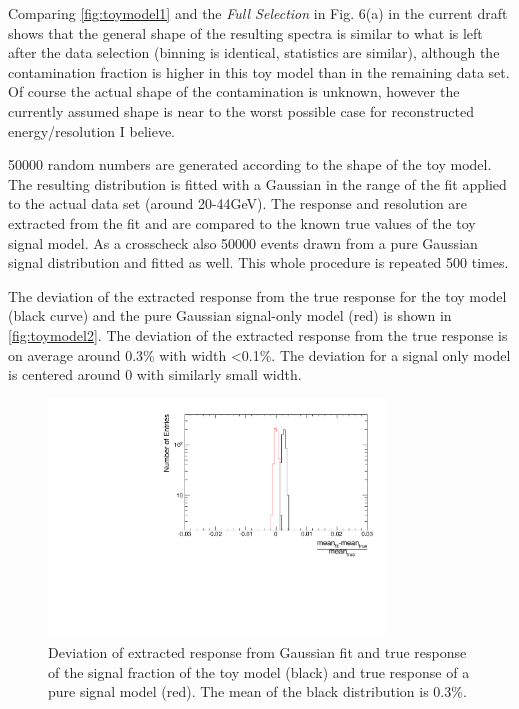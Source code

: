 \documentclass[twoside,a4paper,12pt]{article}
\begin{document}
Comparing \autoref{fig:toymodel1} and the \emph{Full Selection} in Fig. 6(a) in the current draft shows that the general shape of the resulting spectra is similar to what is left after the data selection (binning is identical, statistics are similar), although the contamination fraction is higher in this toy model than in the remaining data set. Of course the actual shape of the contamination is unknown, however the currently assumed shape is near to the worst possible case for reconstructed energy/resolution I believe.

50000 random numbers are generated according to the shape of the toy model. The resulting distribution is fitted with a Gaussian in the range of the fit applied to the actual data set (around 20-44GeV). The response and resolution are extracted from the fit and are compared to the known true values of the toy signal model. As a crosscheck also 50000 events drawn from a pure Gaussian signal distribution and fitted as well.
This whole procedure is repeated 500 times.

The deviation of the extracted response from the true response for the toy model (black curve) and the pure Gaussian signal-only model (red) is shown in \autoref{fig:toymodel2}. The deviation of the extracted response from the true response is on average around 0.3\% with width \textless 0.1\%. The deviation for a signal only model is centered around 0 with similarly small width.
\begin{figure}[htbp]
\begin{center}
\includegraphics[width=0.8\textwidth,page=1]{ToyModelFit}
\caption{Deviation of extracted response from Gaussian fit and true response of the signal fraction of the toy model (black) and true response of a pure signal model (red). The mean of the black distribution is 0.3\%.}
\label{fig:toymodel2}
\end{center}
\end{figure} 
\end{document}
